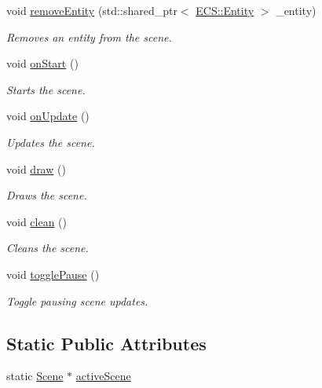 \begin{DoxyCompactItemize}
void \hyperlink{class_cookie_eng_1_1_scene_1_1_scene_aefa43f3ce579fe9798870c95d92711db}{remove\+Entity} (std\+::shared\+\_\+ptr$<$ \hyperlink{class_cookie_eng_1_1_e_c_s_1_1_entity}{E\+C\+S\+::\+Entity} $>$ \+\_\+entity)
\begin{DoxyCompactList}\small\item\em Removes an entity from the scene. \end{DoxyCompactList}\item 
void \hyperlink{class_cookie_eng_1_1_scene_1_1_scene_ab66ffdb5475b0045d0ce5a846488590c}{on\+Start} ()
\begin{DoxyCompactList}\small\item\em Starts the scene. \end{DoxyCompactList}\item 
void \hyperlink{class_cookie_eng_1_1_scene_1_1_scene_a10fa9798a2d0cff5527a4ca160a5202f}{on\+Update} ()
\begin{DoxyCompactList}\small\item\em Updates the scene. \end{DoxyCompactList}\item 
void \hyperlink{class_cookie_eng_1_1_scene_1_1_scene_a94dbc42f8c5b2f7774d8e0de1f5e45a7}{draw} ()
\begin{DoxyCompactList}\small\item\em Draws the scene. \end{DoxyCompactList}\item 
void \hyperlink{class_cookie_eng_1_1_scene_1_1_scene_a3e1fa17bfd8e0e3af72db05c7a5ae0b3}{clean} ()
\begin{DoxyCompactList}\small\item\em Cleans the scene. \end{DoxyCompactList}\item 
void \hyperlink{class_cookie_eng_1_1_scene_1_1_scene_a8e5afd25964ae88a620d7f5b5f349f43}{toggle\+Pause} ()
\begin{DoxyCompactList}\small\item\em Toggle pausing scene updates. \end{DoxyCompactList}\end{DoxyCompactItemize}
\subsection*{Static Public Attributes}
\begin{DoxyCompactItemize}
\item 
static \hyperlink{class_cookie_eng_1_1_scene_1_1_scene}{Scene} $\ast$ \hyperlink{class_cookie_eng_1_1_scene_1_1_scene_a367277df49168535200a279da96d11c2}{active\+Scene}
\end{DoxyCompactItemize}
